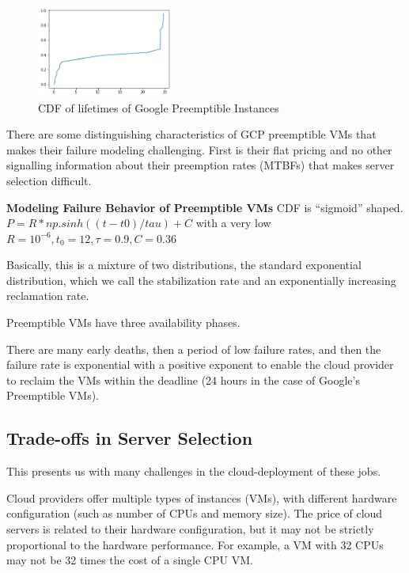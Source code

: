 \begin{figure}
  \centering
  \includegraphics[width=0.4\textwidth]{../data/f20.png}
  \caption{CDF of lifetimes of Google Preemptible Instances }
  \label{fig:gcp1}
\end{figure}

There are some distinguishing characteristics of GCP preemptible VMs that makes their failure modeling challenging.
First is their flat pricing and no other signalling information about their preemption rates (MTBFs) that makes server selection difficult.

\textbf{Modeling Failure Behavior of Preemptible VMs}
CDF is ``sigmoid'' shaped.
$P=R*np.sinh((t-t0)/tau) + C$ with a very low $R=10^{-6}, t_0=12, \tau=0.9, C=0.36$

Basically, this is a mixture of two distributions, the standard exponential distribution, which we call the stabilization rate and an exponentially increasing reclamation rate.

Preemptible VMs have three availability phases.

There are many early deaths, then a period of low failure rates, and then the failure rate is exponential with a positive exponent to enable the cloud provider to reclaim the VMs within the deadline (24 hours in the case of Google's Preemptible VMs).



\subsection{Trade-offs in Server Selection}

This presents us with many challenges in the cloud-deployment of these jobs.

Cloud providers offer multiple types of instances (VMs), with different hardware configuration (such as number of CPUs and memory size).
The price of cloud servers is related to their hardware configuration, but it may not be strictly proportional to the hardware performance.
For example, a VM with 32 CPUs may not be 32 times the cost of a single CPU VM.


